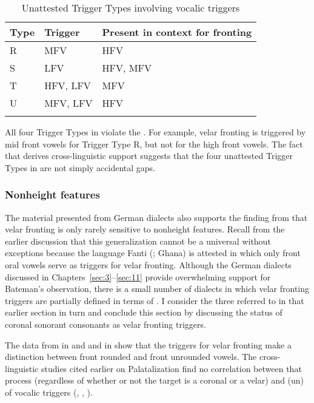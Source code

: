 \begin{table}
\caption{Unattested Trigger Types involving vocalic triggers\label{tab:12.31}}
\begin{tabular}{lll}
\lsptoprule
Type & Trigger & Present in context for fronting\\\midrule
R & MFV & HFV\\
S & LFV & HFV, MFV\\
T & HFV, LFV & MFV\\
U & MFV, LFV & HFV\\
\lspbottomrule
\end{tabular}
\end{table}

All four Trigger Types in  violate the . For example, velar fronting is triggered by mid front vowels for Trigger Type R, but not for the high front vowels. The fact that  derives cross-linguistic support suggests that the four unattested Trigger Types in  are not simply accidental gaps.

\subsubsection{Nonheight features} The material presented from German dialects also supports the finding from \citet[62]{Bateman2007} that velar fronting is only rarely sensitive to nonheight features. Recall from the earlier discussion that this generalization cannot be a universal without exceptions because the language Fanti (; Ghana) is attested in which only front oral vowels serve as triggers for velar fronting. Although the German dialects discussed in Chapters~\ref{sec:3}--\ref{sec:11} provide overwhelming support for Bateman’s observation, there is a small number of dialects in which velar fronting triggers are partially defined in terms of . I consider the three  referred to in that earlier section in turn and conclude this section by discussing the status of coronal sonorant consonants as velar fronting triggers.

The data from  in  and  and  in  show that the triggers for velar fronting make a distinction between front rounded and front unrounded vowels. The cross-linguistic studies cited earlier on Palatalization find no correlation between that process (regardless of whether or not the target is a coronal or a velar) and (un) of vocalic triggers (\citealt{Bhat1978}, \citealt{Bateman2007,Bateman2011}, \citealt{Kochetov2011}).


